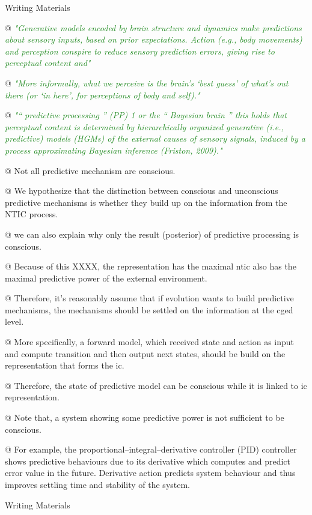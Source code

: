 \documentclass[utf8]{article}
\newenvironment{writingMaterials}
			{	
				\begin{tcolorbox}[size=small, colframe=black!20!white, toprule=1mm]
					Writing Materials
				\end{tcolorbox}

				\begin{easylist}[itemize]		
			}
			{
				\end{easylist}
				\begin{tcolorbox}[size=small, bottomrule=1mm, halign=flush right, colframe=black!20!white]
					Writing Materials
				\end{tcolorbox}			
			}
\newcommand{\rewrite}[1]{\textcolor{ForestGreen}{\textit{"#1"}}\newline}
\begin{document}
\begin{writingMaterials}
				@ \rewrite{Generative models encoded by brain structure and dynamics make predictions about sensory inputs, based on prior expectations. Action (e.g., body movements) and perception conspire to reduce sensory prediction errors, giving rise to perceptual content and} 
				
				@ \rewrite{More informally, what we perceive is the brain’s ‘best guess’ of what’s out there (or ‘in here’, for perceptions of body and self).}
				
				@ \rewrite{“ predictive processing ” (PP) 1 or the “ Bayesian brain ” this holds that perceptual content is determined by hierarchically organized generative (i.e., predictive) models (HGMs) of the external causes of sensory signals, induced by a process approximating Bayesian inference (Friston, 2009).}
				
				
				
				@ Not all predictive mechanism are conscious.
				
				
				@ We hypothesize that the distinction between conscious and unconscious predictive mechanisms is whether they build up on the information from the NTIC process. 
				

				
				
				@ we can also explain why only the result (posterior) of predictive processing is conscious. 

			
				@ Because of this XXXX, the representation has the maximal \ac{ntic} also has the maximal predictive power of the external environment. 
				
				
				@ Therefore, it's reasonably assume that if evolution wants to build predictive mechanisms, the mechanisms should be settled on the information at the \ac{cged} level.
				
				@ More specifically, a forward model, which received state and action as input and compute transition and then output next states, should be build on the representation that forms the \acl{ic}. 
				
				@ Therefore, the state of predictive model can be conscious while it is linked to \acl{ic} representation. 
				
				@ Note that, a system showing some predictive power is not sufficient to be conscious. 
				
				@ For example, the proportional–integral–derivative controller (PID) controller shows predictive behaviours due to its derivative which computes and predict error value in the future. Derivative action predicts system behaviour and thus improves settling time and stability of the system. 
				

\end{writingMaterials}
\end{document}
